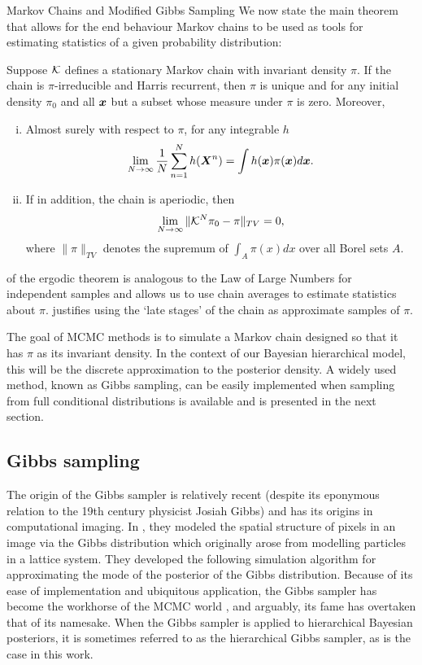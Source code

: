 \begin{chapter}{Markov Chains and Modified Gibbs Sampling}
We now state the main theorem that allows for the end behaviour Markov chains to be used as tools for estimating statistics of a given probability distribution:
\begin{thm} \label{thm:ergodicTheorem}
  \citep{tierney1994markov} Suppose $\mathcal K$ defines a stationary Markov chain with invariant density $\pi$. If the chain is $\pi$-irreducible and Harris recurrent, then $\pi$ is unique and for any initial density $\pi_0$ and all $\mbox{\boldmath$x$}$ but a subset whose measure under $\pi$ is zero. Moreover,
  \begin{enumerate}[(i)]
    \item Almost surely with respect to $\pi$, for any integrable $h$ \begin{equation} \lim_{N\to \infty}\frac 1N\sum_{n=1}^N h(\mbox{\boldmath$X$}^n) = \int h(\mbox{\boldmath$x$}) \pi(\mbox{\boldmath$x$}) d\mbox{\boldmath$x$}. \label{eq:ergodicStat}\end{equation}
    \item If in addition, the chain is aperiodic, then \begin{equation} \lim_{N\to \infty}\|\mathcal K^N\pi_0 - \pi\|_{TV} = 0, \label{eq:ergodicDist}\end{equation}
    where $\|\pi\|_{TV}$ denotes the supremum of $\int_A \pi(x) dx$ over all Borel sets $A$.
  \end{enumerate}
\end{thm}
 of the ergodic theorem is analogous to the Law of Large Numbers for independent samples and allows us to use chain averages to estimate statistics about $\pi$.  
 justifies using the `late stages' of the chain as approximate samples of $\pi$.

The goal of MCMC methods is to simulate a Markov chain designed so that it has $\pi$ as its invariant density.  
In the context of our Bayesian hierarchical model, this will be the discrete approximation to the posterior density.
A widely used method, known as Gibbs sampling, can be easily implemented when sampling from full conditional distributions is available and is presented in the next section.

\subsection{Gibbs sampling}

The origin of the Gibbs sampler is relatively recent (despite its eponymous relation to the 19th century physicist Josiah Gibbs) and has its origins in computational imaging. 
In \citep{geman1984stochastic}, they modeled the spatial structure of pixels in an image via the Gibbs distribution which originally arose from modelling particles in a lattice system.
They developed the following simulation algorithm for approximating the mode of the posterior of the Gibbs distribution.
Because of its ease of implementation and ubiquitous application, the Gibbs sampler has become the workhorse of the MCMC world \citep{robert2013monte}, and arguably, its fame has overtaken that of its namesake.
When the Gibbs sampler is applied to hierarchical Bayesian posteriors, it is sometimes referred to as the hierarchical Gibbs sampler, as is the case in this work.


\end{chapter}
